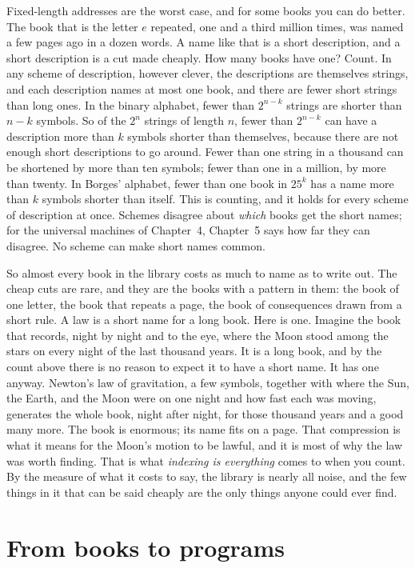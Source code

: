 Fixed-length addresses are the worst case, and for some books you can do better. The book that is the letter $e$ repeated, one and a third million times, was named a few pages ago in a dozen words. A name like that is a short description, and a short description is a cut made cheaply. How many books have one? Count. In any scheme of description, however clever, the descriptions are themselves strings, and each description names at most one book, and there are fewer short strings than long ones. In the binary alphabet, fewer than $2^{n-k}$ strings are shorter than $n-k$ symbols. So of the $2^n$ strings of length $n$, fewer than $2^{n-k}$ can have a description more than $k$ symbols shorter than themselves, because there are not enough short descriptions to go around. Fewer than one string in a thousand can be shortened by more than ten symbols; fewer than one in a million, by more than twenty. In Borges' alphabet, fewer than one book in $25^k$ has a name more than $k$ symbols shorter than itself. This is counting, and it holds for every scheme of description at once. Schemes disagree about \emph{which} books get the short names; for the universal machines of Chapter~4, Chapter~5 says how far they can disagree. No scheme can make short names common.

So almost every book in the library costs as much to name as to write out. The cheap cuts are rare, and they are the books with a pattern in them: the book of one letter, the book that repeats a page, the book of consequences drawn from a short rule. A law is a short name for a long book. Here is one. Imagine the book that records, night by night and to the eye, where the Moon stood among the stars on every night of the last thousand years. It is a long book, and by the count above there is no reason to expect it to have a short name. It has one anyway. Newton's law of gravitation, a few symbols, together with where the Sun, the Earth, and the Moon were on one night and how fast each was moving, generates the whole book, night after night, for those thousand years and a good many more. The book is enormous; its name fits on a page. That compression is what it means for the Moon's motion to be lawful, and it is most of why the law was worth finding. That is what \emph{indexing is everything} comes to when you count. By the measure of what it costs to say, the library is nearly all noise, and the few things in it that can be said cheaply are the only things anyone could ever find.

\section*{From books to programs}

